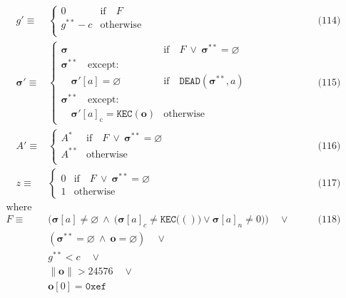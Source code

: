 \documentclass[
]{ltjsarticle}
\begin{document}
\[\begin{aligned}
\quad g' \equiv & \begin{cases}
0 & \text{if} \quad F \\
g^{**} - c & \text{otherwise} \\
\end{cases} & \qquad \text{(114)} \\
\quad \boldsymbol{\sigma}' \equiv & \begin{cases}
\boldsymbol{\sigma} & \text{if} \quad F \ \lor\ \boldsymbol{\sigma}^{**} = \varnothing \\
\boldsymbol{\sigma}^{**} \quad \text{except:} & \\
\quad\boldsymbol{\sigma}'[a] = \varnothing & \text{if} \quad \mathtt{DEAD}(\boldsymbol{\sigma}^{**}, a) \\
\boldsymbol{\sigma}^{**} \quad \text{except:} & \\
\quad\boldsymbol{\sigma}'[a]_{\mathrm{c}} = \texttt{KEC}(\mathbf{o}) & \text{otherwise}
\end{cases} & \qquad \text{(115)} \\
\quad A' \equiv & \begin{cases}
A^{*} & \text{if} \quad F \ \lor\ \boldsymbol{\sigma}^{**} = \varnothing \\
A^{**} & \text{otherwise} \\
\end{cases} & \qquad \text{(116)} \\
\quad z \equiv & \begin{cases}
0 & \text{if} \quad F \ \lor\ \boldsymbol{\sigma}^{**} = \varnothing \\
1 & \text{otherwise}
\end{cases} & \qquad \text{(117)} \\
\text{where} \\
F \equiv  & \big( \boldsymbol{\sigma}[a] \neq \varnothing \ \wedge\ \big(\boldsymbol{\sigma}[a]_c \neq \texttt{KEC}\big(()\big) \vee \boldsymbol{\sigma}[a]_n \neq 0 \big) \big) \quad \vee & \qquad \text{(118)} \\
&(\boldsymbol{\sigma}^{**} = \varnothing \ \wedge\ \mathbf{o} = \varnothing) \quad \vee \\
&g^{**} < c \quad \vee \\
&\lVert \mathbf{o} \rVert > 24576 \quad \vee \\
&\mathbf{o}[0] = \texttt{0xef}
\end{aligned}\]

\protect\hypertarget{contract_creation_result}{}{}
\end{document}
